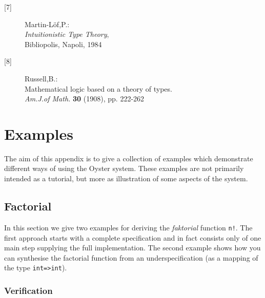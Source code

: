 \documentclass[11pt]{report}
\begin{document}
\begin{description}
 \item[{[7]}]
 \begin{tabbing}
 Martin-L\"{o}f,P.: \\
 \emph{Intuitionistic Type Theory},\\
 Bibliopolis, Napoli, 1984
 \end{tabbing}
 
 \item[{[8]}]
 \begin{tabbing}
 Russell,B.:\\
  Mathematical logic based on a theory of types.\\
 \emph{Am.J.of Math.} {\bf 30} (1908), pp. 222-262
 \end{tabbing}
 
 \end{description}
 
 \appendix
 
 \chapter{Examples}
 
 The aim of this appendix is to give a collection of examples
 which demonstrate different ways of using the Oyster system.
 These examples are not primarily intended as a tutorial, 
 but more as illustration of some aspects of the system.
 
 \section{Factorial }
 
 In this section we give two examples for deriving 
 the \emph{faktorial} function \verb'n!'. The first approach
 starts with a complete specification and in fact consists
 only of one main step supplying the full implementation.
 The second example shows how you can synthesise the
 factorial function from an underspecification (as a mapping 
 of the type \verb'int=>int').
 
 \subsection{Verification}
 
\end{document}
